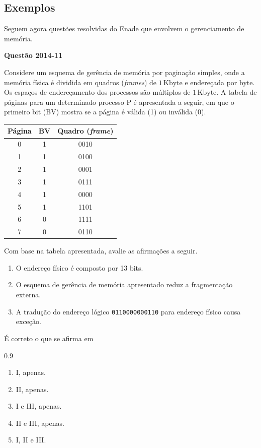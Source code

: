 \documentclass[12pt,a4paper]{article}
\newenvironment{Question}[1]{%
    \pdfbookmark[3]{Questão #1}{q:#1}
    \label{q:#1}
    \par\bigskip\noindent
    \textbf{Questão #1} \dotfill
    \par\noindent
    \nopagebreak
    \ignorespaces
}{%
    \noindent\dotfill
}
\newenvironment{QuestionOptions}{%
    \begin{spacing}{0.9}%
    \small
    \begin{enumerate}[label=\Alph*)]
}{%
    \end{enumerate}
    \end{spacing}
}
\newcommand{\unit}[1]{\,\mathrm{#1}}
\begin{document}
\subsection{Exemplos}
Seguem agora questões resolvidas do Enade que envolvem o gerenciamento de memória.

\begin{Question}{2014-11}
Considere um esquema de gerência de memória por paginação simples, onde a memória física é dividida
em quadros (\textit{frames}) de $1 \unit{Kbyte}$ e endereçada por byte.
Os espaços de endereçamento dos processos são múltiplos de $1 \unit{Kbyte}$.
A tabela de páginas para um determinado processo P é apresentada a seguir,
em que o primeiro bit (BV) mostra se a página é válida (1) ou inválida (0).
\begin{center}
\begin{tabular}{|c|c|c|}
\hline
\textbf{Página} & \textbf{BV} & \textbf{Quadro (\textit{frame})} \\
\hline
0 & 1 & 0010 \\
1 & 1 & 0100 \\
2 & 1 & 0001 \\
3 & 1 & 0111 \\
4 & 1 & 0000 \\
5 & 1 & 1101 \\
6 & 0 & 1111 \\
7 & 0 & 0110 \\
\hline
\end{tabular}
\end{center}
Com base na tabela apresentada, avalie as afirmações a seguir.
\begin{enumerate}[label=\Roman*.]
    \item O endereço físico é composto por 13 bits.
    \item O esquema de gerência de memória apresentado reduz a fragmentação externa.
    \item A tradução do endereço lógico \texttt{0110000000110} para endereço físico causa exceção.
\end{enumerate}
É correto o que se afirma em
\begin{QuestionOptions}
    \item I, apenas.
    \item II, apenas.
    \item I e III, apenas.
    \item II e III, apenas.
    \item I, II e III.
\end{QuestionOptions}
\end{Question}
\end{document}
